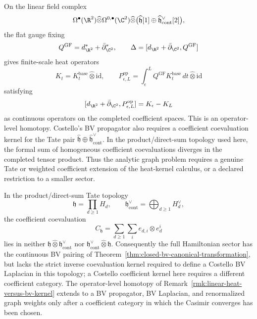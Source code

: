 \documentclass[11pt]{memoir}
\begin{document}
\begin{rmk}\label{rmk:linear-heat-versus-bv-kernel}
  On the linear field complex
  $$\Omega^\bullet(\R^2)\widehat\otimes
    \Omega^{0,\bullet}(\C^2)\widehat\otimes
    \bigl(\widehat{\mathfrak h}[1]\oplus
      \widehat{\mathfrak h}^{\vee}_{\mathrm{cont}}[2]\bigr),$$
  the flat gauge fixing
  $$Q^{\mathrm{GF}}=d_{\R^2}^*+\bar\partial_{\C^2}^*,\qquad
    \Delta=[d_{\R^2}+\bar\partial_{\C^2},Q^{\mathrm{GF}}]$$
  gives finite-scale heat operators
  $$K_t=K_t^{\mathrm{base}}\widehat\otimes\mathrm{id},\qquad
    P_{\epsilon,L}^{\mathrm{op}}
      =\int_\epsilon^L Q^{\mathrm{GF}}K_t^{\mathrm{base}}\,dt
        \widehat\otimes\mathrm{id}$$
  satisfying
  $$[d_{\R^2}+\bar\partial_{\C^2},P_{\epsilon,L}^{\mathrm{op}}]
    =K_\epsilon-K_L$$
  as continuous operators on the completed coefficient spaces. This is an
  operator-level homotopy. Costello's BV propagator also requires a
  coefficient coevaluation kernel for the Tate pair
  $\widehat{\mathfrak h}\oplus\widehat{\mathfrak h}^{\vee}_{\mathrm{cont}}$.
  In the product/direct-sum topology used here, the formal sum of homogeneous
  coefficient coevaluations diverges in the completed tensor
  product. Thus the analytic graph problem requires a genuine Tate or weighted
  coefficient extension of the heat-kernel calculus, or a declared restriction
  to a smaller sector.
\end{rmk}

\begin{lem}\label{lem:tate-casimir-obstruction}
  In the product/direct-sum Tate topology
  $$\mathfrak h=\prod_{d\geq1}H_d,\qquad
    \mathfrak h^\vee_{\mathrm{cont}}=\bigoplus_{d\geq1}H_d^\vee,$$
  the coefficient coevaluation
  $$C_{\mathfrak h}=\sum_{d\geq1}\sum_i e_{d,i}\otimes e^i_{d}$$
  lies in neither $\mathfrak h\widehat\otimes\mathfrak h^\vee_{\mathrm{cont}}$
  nor $\mathfrak h^\vee_{\mathrm{cont}}\widehat\otimes\mathfrak h$.
  Consequently the full Hamiltonian sector has the continuous BV pairing
  of Theorem~\ref{thm:closed-bv-canonical-transformation}, but lacks the
  strict inverse coevaluation kernel required to define a Costello BV
  Laplacian in this topology; a Costello coefficient kernel here
  requires a different coefficient category.  The
  operator-level homotopy of
  Remark~\ref{rmk:linear-heat-versus-bv-kernel} extends to a BV
  propagator, BV Laplacian, and renormalized graph weights only after a
  coefficient category in which the Casimir converges has been chosen.
\end{lem}
\end{document}
